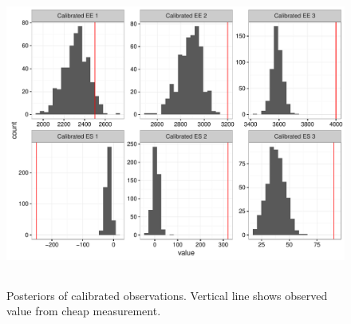 \documentclass[11pt]{article}\usepackage[]{graphicx}\usepackage[]{color}
\begin{document}
  
  
  
  
  \begin{figure}
  \centering
  \includegraphics[width=17cm,height=10cm]{manual_figure/wpcalhist.pdf}
  \caption{Posteriors of calibrated observations. Vertical line shows observed value from cheap measurement.}
  \label{wpcalhist}
  \end{figure}
  
  
  
\end{document}
